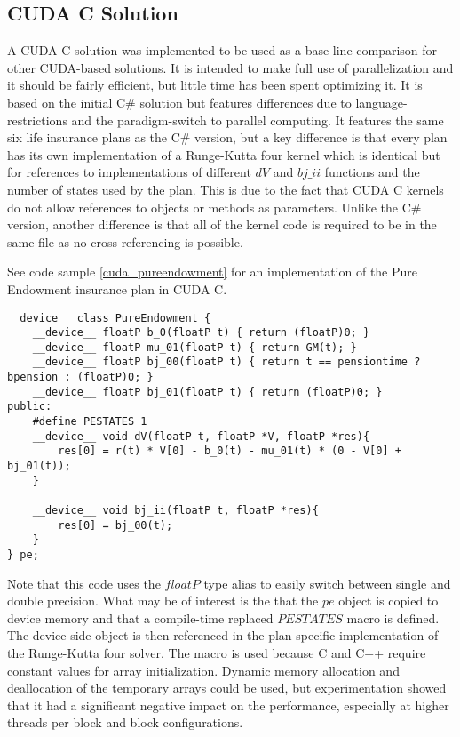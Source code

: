 \subsection{CUDA C Solution}
A CUDA C solution was implemented to be used as a base-line comparison for other CUDA-based solutions.
It is intended to make full use of parallelization and it should be fairly efficient, but little time has been spent optimizing it.
It is based on the initial C\# solution but features differences due to language-restrictions and the paradigm-switch to parallel computing.
It features the same six life insurance plans as the C\# version, but a key difference is that every plan has its own implementation of a Runge-Kutta four kernel which is identical but for references to implementations of different $dV$ and $bj\_ii$ functions and the number of states used by the plan.
This is due to the fact that CUDA C kernels do not allow references to objects or methods as parameters. %
Unlike the C\# version, another difference is that all of the kernel code is required to be in the same file as no cross-referencing is possible.

See code sample \ref{cuda_pureendowment} for an implementation of the Pure Endowment insurance plan in CUDA C.
\begin{lstlisting}[language=cudac, caption=The pure endowment insurance plan expressed in CUDA C, label=cuda_pureendowment]
__device__ class PureEndowment {
	__device__ floatP b_0(floatP t) { return (floatP)0; }
	__device__ floatP mu_01(floatP t) { return GM(t); }
	__device__ floatP bj_00(floatP t) { return t == pensiontime ? bpension : (floatP)0; }
	__device__ floatP bj_01(floatP t) { return (floatP)0; }
public:
	#define PESTATES 1
	__device__ void dV(floatP t, floatP *V, floatP *res){ 
		res[0] = r(t) * V[0] - b_0(t) - mu_01(t) * (0 - V[0] + bj_01(t));
	}

	__device__ void bj_ii(floatP t, floatP *res){
		res[0] = bj_00(t);
	}
} pe;
\end{lstlisting}

Note that this code uses the $floatP$ type alias to easily switch between single and double precision.
What may be of interest is the that the $pe$ object is copied to device memory and that a compile-time replaced $PESTATES$ macro is defined.
The device-side object is then referenced in the plan-specific implementation of the Runge-Kutta four solver.
The macro is used because C and C++ require constant values for array initialization.
Dynamic memory allocation and deallocation of the temporary arrays could be used, but experimentation showed that it had a significant negative impact on the performance, especially at higher threads per block and block configurations.

